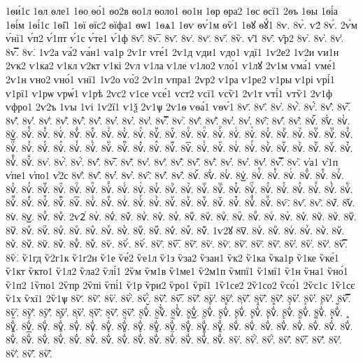 {1ѳи́1с
1ѳл
ѳле1
1ѳо
ѳо́1
ѳо2в
ѳо1л
ѳоло1
ѳо1н
1ѳр
ѳра2
1ѳс
ѳсї1
2ѳъ
1ѳы
1ѳі́а
1ѳі́м
1ѳі́1с
1ѳі̑1
1ѳї
ѳїс2
ѳїфа1
ѳѡ1
1ѳѧ1
1ѳѵ
ѳѵ́1м
ѳѷ1
1ѳꙋ
ѳꙋ́1
8ѵ.
8ѵ̀.
ѵ2́
8ѵ́.
2ѵ́м
ѵ́нї1
ѵ́п2
ѵ́1пт
ѵ́1с
ѵ́те1
ѵ́1ф
8ѵ̂.
8ѵ̅.
8ѵ̆.
8ѵ̇.
8ѵ̈.
8ѵ̋.
8ѷ.
ѵ̑1
8ѵ̑.
ѵ̑р2
8ѵ̓.
8ѵ̔.
8ѵ̾.
8ѵ̿.
8ѵ͘.
1ѵ2а
ѵа́2
ѵа́н1
ѵа1р
2ѵ1г
ѵге́1
2ѵ1д
ѵди1
ѵдо1
ѵдї1
1ѵ2е2
1ѵ2и
ѵи1н
2ѵк2
ѵ1ка2
ѵ1кл
ѵ2кт
ѵ1кі
2ѵл
ѵ1ла
ѵ1ле
ѵ1ло2
ѵло́1
ѵ1лꙋ
2ѵ1м
ѵма́1
ѵме́1
2ѵ1н
ѵно2
ѵно́1
ѵнї1
1ѵ2о
ѵо́2
2ѵ1п
ѵпра1
2ѵр2
ѵ1ра
ѵ1ре2
ѵ1ры
ѵ1рі
ѵрі́1
ѵ1рї1
ѵ1рѡ
ѵрѡ́1
ѵ1рѣ
2ѵс2
ѵ1се
ѵсе́1
ѵст2
ѵсї1
ѵсѷ1
2ѵ1т
ѵті́1
ѵтѷ1
2ѵ1ф
ѵфро1
2ѵ2ъ
1ѵы
1ѵі
1ѵ2ї1
ѵ1ѯ
2ѵ1ѱ
2ѵ1ѳ
ѵѳа́1
ѵѳѵ́1
8ѵ҃.
8ѵ҄.
8ѵ҅.
8ѵ҅̀.
8ѵ҅́.
8ѵ҅̂.
8ѵ҅̅.
8ѵ҅̆.
8ѵ҅̇.
8ѵ҅̈.
8ѵ҅̋.
8ѵ҅̏.
8ѵ҅̑.
8ѵ҅̓.
8ѵ҅̔.
8ѵ҅̾.
8ѵ҅̿.
8ѵ҅͘.
8ѵ҅҃.
8ѵ҅҄.
8ѵ҅҅.
8ѵ҅҆.
8ѵ҅҇.
8ѵ҅᷀.
8ѵ҅᷁.
8ѵ҅᷶.
8ѵ᷷҅.
8ѵ᷸҅.
8ѵ᷹҅.
8ѵ҅ⷠ.
8ѵ҅ⷡ.
8ѵ҅ⷢ.
8ѵ҅ⷣ.
8ѵ҅ⷤ.
8ѵ҅ⷥ.
8ѵ҅ⷦ.
8ѵ҅ⷧ.
8ѵ҅ⷨ.
8ѵ҅ⷩ.
8ѵ҅ⷪ.
8ѵ҅ⷫ.
8ѵ҅ⷬ.
8ѵ҅ⷭ.
8ѵ҅ⷮ.
8ѵ҅ⷯ.
8ѵ҅ⷰ.
8ѵ҅ⷱ.
8ѵ҅ⷲ.
8ѵ҅ⷳ.
8ѵ҅ⷴ.
8ѵ҅ⷵ.
8ѵ҅ⷶ.
8ѵ҅ⷷ.
8ѵ҅ⷸ.
8ѵ҅ⷹ.
8ѵ҅ⷺ.
8ѵ҅ⷻ.
8ѵ҅ⷼ.
8ѵ҅ⷽ.
8ѵ҅ⷾ.
8ѵ҅ⷿ.
8ѵ҅꙯.
8ѵ҅ꙴ.
8ѵ҅ꙵ.
8ѵ҅ꙶ.
8ѵ҅ꙷ.
8ѵ҅ꙸ.
8ѵ҅ꙹ.
8ѵ҅ꙺ.
8ѵ҅ꙻ.
8ѵ҅꙼.
8ѵ҅꙽.
8ѵ҅ꚞ.
8ѵ҅ꚟ.
8ѵ҆.
8ѵ҆̀.
8ѵ҆́.
8ѵ҆̂.
8ѵ҆̅.
8ѵ҆̆.
8ѵ҆̇.
8ѵ҆̈.
8ѵ҆̋.
8ѵ҆̏.
8ѵ҆̑.
8ѵ҆̓.
8ѵ҆̔.
8ѵ҆̾.
8ѵ҆̿.
8ѵ҆͘.
ѵ҆а1
ѵ҆1п
ѵ҆пе1
ѵ҆по1
ѵ҆2с
8ѵ҆҃.
8ѵ҆҄.
8ѵ҆҅.
8ѵ҆҆.
8ѵ҆҇.
8ѵ҆᷀.
8ѵ҆᷁.
8ѵ҆᷶.
8ѵ᷷҆.
8ѵ᷸҆.
8ѵ᷹҆.
8ѵ҆ⷠ.
8ѵ҆ⷡ.
8ѵ҆ⷢ.
8ѵ҆ⷣ.
8ѵ҆ⷤ.
8ѵ҆ⷥ.
8ѵ҆ⷦ.
8ѵ҆ⷧ.
8ѵ҆ⷨ.
8ѵ҆ⷩ.
8ѵ҆ⷪ.
8ѵ҆ⷫ.
8ѵ҆ⷬ.
8ѵ҆ⷭ.
8ѵ҆ⷮ.
8ѵ҆ⷯ.
8ѵ҆ⷰ.
8ѵ҆ⷱ.
8ѵ҆ⷲ.
8ѵ҆ⷳ.
8ѵ҆ⷴ.
8ѵ҆ⷵ.
8ѵ҆ⷶ.
8ѵ҆ⷷ.
8ѵ҆ⷸ.
8ѵ҆ⷹ.
8ѵ҆ⷺ.
8ѵ҆ⷻ.
8ѵ҆ⷼ.
8ѵ҆ⷽ.
8ѵ҆ⷾ.
8ѵ҆ⷿ.
8ѵ҆꙯.
8ѵ҆ꙴ.
8ѵ҆ꙵ.
8ѵ҆ꙶ.
8ѵ҆ꙷ.
8ѵ҆ꙸ.
8ѵ҆ꙹ.
8ѵ҆ꙺ.
8ѵ҆ꙻ.
8ѵ҆꙼.
8ѵ҆꙽.
8ѵ҆ꚞ.
8ѵ҆ꚟ.
8ѵ҇.
8ѵ᷀.
8ѵ᷁.
8ѵ᷶.
8ѵ᷷.
8ѵ᷸.
8ѵ᷹.
8ѵⷠ.
8ѵⷡ.
2ѵ2ⷢ
8ѵⷢ.
8ѵⷣ.
8ѵⷤ.
8ѵⷥ.
8ѵⷦ.
8ѵⷧ.
8ѵⷨ.
8ѵⷩ.
8ѵⷪ.
8ѵⷫ.
8ѵⷬ.
8ѵⷭ.
8ѵⷮ.
8ѵⷯ.
8ѵⷰ.
8ѵⷱ.
8ѵⷲ.
8ѵⷳ.
8ѵⷴ.
8ѵⷵ.
8ѵⷶ.
8ѵⷷ.
8ѵⷸ.
8ѵⷹ.
8ѵⷺ.
8ѵⷻ.
8ѵⷼ.
8ѵⷽ.
8ѵⷾ.
8ѵⷿ.
1ѵ2ꙋ
8ѵ꙯.
8ѵꙴ.
8ѵꙵ.
8ѵꙶ.
8ѵꙷ.
8ѵꙸ.
8ѵꙹ.
8ѵꙺ.
8ѵꙻ.
8ѵ꙼.
8ѵ꙽.
8ѵꚞ.
8ѵꚟ.
8ѷ.
8ѷ̀.
8ѷ́.
8ѷ̂.
8ѷ̅.
8ѷ̆.
8ѷ̇.
8ѷ̈.
8ѷ̋.
8ѷ̏.
8ѷ̑.
8ѷ̓.
8ѷ̔.
8ѷ̾.
8ѷ̿.
8ѷ͘.
ѷ1гд
ѷ2г1к
ѷ1г2н
ѷ1е
ѷе́2
ѷе1л
ѷ1з
ѷза2
ѷзан1
ѷк2
ѷ1ка
ѷка1р
ѷ1ке
ѷке́1
ѷ1кт
ѷкто1
ѷ1л2
ѷла2
ѷлі́1
2ѷм
ѷм1в
ѷ1ме1
ѷ2м1п
ѷмпї1
ѷ1мї1
ѷ1н
ѷна1
ѷно́1
ѷ1п2
1ѷпо1
2ѷпр
2ѷпі
ѷпі́1
ѷ1р
ѷри2
ѷро1
ѷрї1
1ѷ1се2
2ѷ1со2
ѷсо́1
2ѷс1с
1ѷ1сє
ѷ1х
ѷхї1
2ѷ1ѱ
8ѷ҃.
8ѷ҄.
8ѷ҅.
8ѷ҅̀.
8ѷ҅́.
8ѷ҅̂.
8ѷ҅̅.
8ѷ҅̆.
8ѷ҅̇.
8ѷ҅̈.
8ѷ҅̋.
8ѷ҅̏.
8ѷ҅̑.
8ѷ҅̓.
8ѷ҅̔.
8ѷ҅̾.
8ѷ҅̿.
8ѷ҅͘.
8ѷ҅҃.
8ѷ҅҄.
8ѷ҅҅.
8ѷ҅҆.
8ѷ҅҇.
8ѷ҅᷀.
8ѷ҅᷁.
8ѷ҅᷶.
8ѷ᷷҅.
8ѷ᷸҅.
8ѷ᷹҅.
8ѷ҅ⷠ.
8ѷ҅ⷡ.
8ѷ҅ⷢ.
8ѷ҅ⷣ.
8ѷ҅ⷤ.
8ѷ҅ⷥ.
8ѷ҅ⷦ.
8ѷ҅ⷧ.
8ѷ҅ⷨ.
8ѷ҅ⷩ.
8ѷ҅ⷪ.
8ѷ҅ⷫ.
8ѷ҅ⷬ.
8ѷ҅ⷭ.
8ѷ҅ⷮ.
8ѷ҅ⷯ.
8ѷ҅ⷰ.
8ѷ҅ⷱ.
8ѷ҅ⷲ.
8ѷ҅ⷳ.
8ѷ҅ⷴ.
8ѷ҅ⷵ.
8ѷ҅ⷶ.
8ѷ҅ⷷ.
8ѷ҅ⷸ.
8ѷ҅ⷹ.
8ѷ҅ⷺ.
8ѷ҅ⷻ.
8ѷ҅ⷼ.
8ѷ҅ⷽ.
8ѷ҅ⷾ.
8ѷ҅ⷿ.
8ѷ҅꙯.
8ѷ҅ꙴ.
8ѷ҅ꙵ.
8ѷ҅ꙶ.
8ѷ҅ꙷ.
8ѷ҅ꙸ.
8ѷ҅ꙹ.
8ѷ҅ꙺ.
8ѷ҅ꙻ.
8ѷ҅꙼.
8ѷ҅꙽.
8ѷ҅ꚞ.
8ѷ҅ꚟ.
8ѷ҆.
8ѷ҆̀.
8ѷ҆́.
8ѷ҆̂.
8ѷ҆̅.
8ѷ҆̆.
8ѷ҆̇.
8ѷ҆̈.
8ѷ҆̋.
8ѷ҆̏.
}
